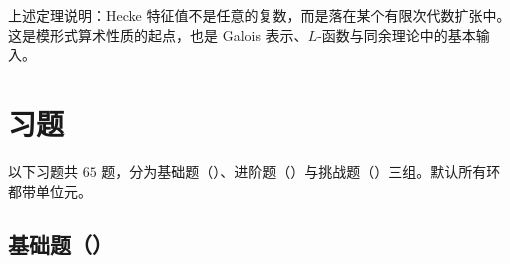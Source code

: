 \begin{remark}
上述定理说明：Hecke 特征值不是任意的复数，而是落在某个有限次代数扩张中。这是模形式算术性质的起点，也是 Galois 表示、$L$-函数与同余理论中的基本输入。
\end{remark}

\section*{习题}

以下习题共 $65$ 题，分为基础题（\basic）、进阶题（\medium）与挑战题（\hard）三组。默认所有环都带单位元。

\subsection*{基础题（\basic）}

